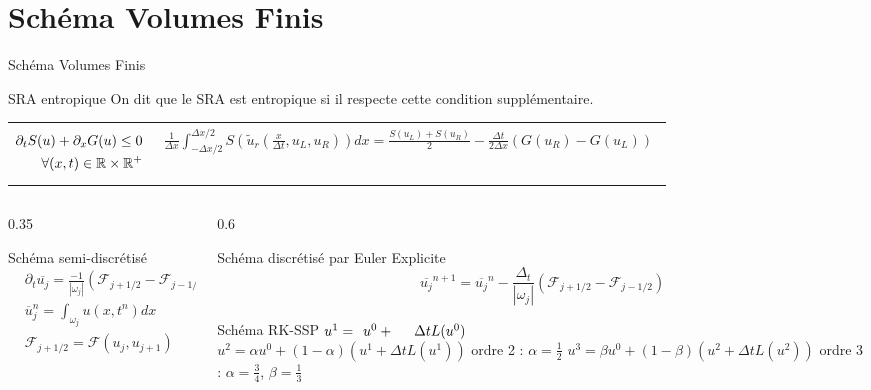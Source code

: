 \section{Schéma Volumes Finis}

\begin{frame}{Schéma Volumes Finis}

\begin{block}{SRA entropique}
On dit que le SRA est entropique si il respecte cette condition supplémentaire.
\begin{tabular}{p{2cm}| p{7cm}}
\begin{align*}
\partial_t S(u) + \partial_x G(u) \leq 0 \\ \forall (x,t) \in \mathbb{R} \times \mathbb{R}^+
\end{align*}
&
\begin{align*}
    \frac{1}{\Delta x}\int_{-\Delta x/2}^{\Delta x/2} S(\widetilde{u}_r(\frac{x}{\Delta t},u_L,u_R)) dx 
   = \frac{S(u_L) + S(u_R)}{2}-  \frac{\Delta t}{2\Delta x}\left(G(u_R)-G(u_L)\right)
\end{align*}
\end{tabular}
\end{block}
\begin{columns}
\begin{column}{0.35 \textwidth}
\begin{block}{Schéma semi-discrétisé}
\begin{align}    
    & \partial_t \overline{u_j} = \frac{-1}{|\omega_j|} (\mathcal{F}_{j+1/2}-\mathcal{F}_{j-1/2})\\
    & \overline{u}_j^n = \int_{\omega_j} u(x,t^n)dx \\
    &\mathcal{F}_{j+1/2} = \mathcal{F}(u_j,u_{j+1})
\end{align}
\end{block}
\end{column}

\begin{column}{0.6 \textwidth}
\begin{block}{Schéma discrétisé par Euler Explicite}
\begin{equation}  
    \overline{u_j}^{n+1} = \overline{u_j}^n - \frac{\Delta_t}{|\omega_j|} (\mathcal{F}_{j+1/2}-\mathcal{F}_{j-1/2})
\end{equation}
\end{block}

\begin{block}{Schéma RK-SSP}
    $u^1 = \hspace{1.5mm}u^0 + \hspace{5mm}\Delta t L(u^0)$ \\
    $u^2 = \alpha u^0 +(1-\alpha)(u^1 + \Delta t L(u^1))$\hspace{.2cm} ordre 2 : $\alpha = \frac{1}{2}$ 
    $u^3 = \beta u^0 +(1-\beta)(u^2 + \Delta t L(u^2))$\hspace{.2cm} ordre 3 : $\alpha = \frac{3}{4}$, $\beta = \frac{1}{3}$
\end{block}


\end{column}
\end{columns}
\end{frame}
